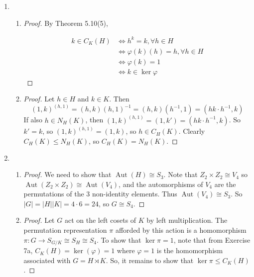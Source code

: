 \documentclass[11pt, letterpaper]{article}
\begin{document}
\begin{enumerate}
  \item \begin{enumerate}
    \item \begin{proof}
      By Theorem 5.10(5), 
      
      \begin{align*}
        k \in C_K(H) &\iff h^k =k, \forall h \in H \\
        &\iff \varphi(k)(h) = h, \forall h \in H  \\
        &\iff \varphi(k) = 1 \\
        &\iff k \in \operatorname{ker} \varphi
      \end{align*}
    \end{proof}

    \item \begin{proof}
      Let $h \in H$ and $k \in K$. Then
      $$
      (1,k)^{(h, 1)} = (h, k)(h, 1)^{-1} = (h, k)(h^{-1}, 1) = (h k \cdot h^{-1}, k)
      $$
      If also $h \in N_H(K)$, then $(1, k)^{(h ,1)} = (1, k') = (hk \cdot h^{-1}, k)$. So $k' = k$, so $(1, k)^{(h, 1)} = (1, k)$, so $h \in C_H(K)$. Clearly $C_H(K) \leq N_H(K)$, so $C_H(K) = N_H(K)$.
    \end{proof}
  \end{enumerate}

  \item \begin{enumerate}
    \item \begin{proof}
      We need to show that $\operatorname{Aut}(H) \cong S_3$. Note that $Z_2 \times Z_2 \cong V_4$ so $\operatorname{Aut}(Z_2 \times Z_2) \cong \operatorname{Aut}(V_4)$, and the automorphisms of $V_4$ are the permutations of the 3 non-identity elements. Thus $\operatorname{Aut}(V_4) \cong S_3$. So $\vert G \vert = \vert H \vert \vert K \vert = 4 \cdot 6 = 24$, so $G \cong S_4$.
    \end{proof}

    \item \begin{proof}
      Let $G$ act on the left cosets of $K$ by left multiplication. The permutation representation $\pi$ afforded by this action is a homomorphism $\pi: G \to S_{G/K} \cong S_H \cong S_4$. To show that $\operatorname{ker} \pi = 1$, note that from Exercise 7a, $C_K(H) = \operatorname{ker}(\varphi) = 1$ where $\varphi = 1$ is the homomorphism associated with $G = H \rtimes K$. So, it remains to show that $\operatorname{ker} \pi \leq C_K(H)$.


\end{proof}
\end{enumerate}
\end{enumerate}
\end{document}
